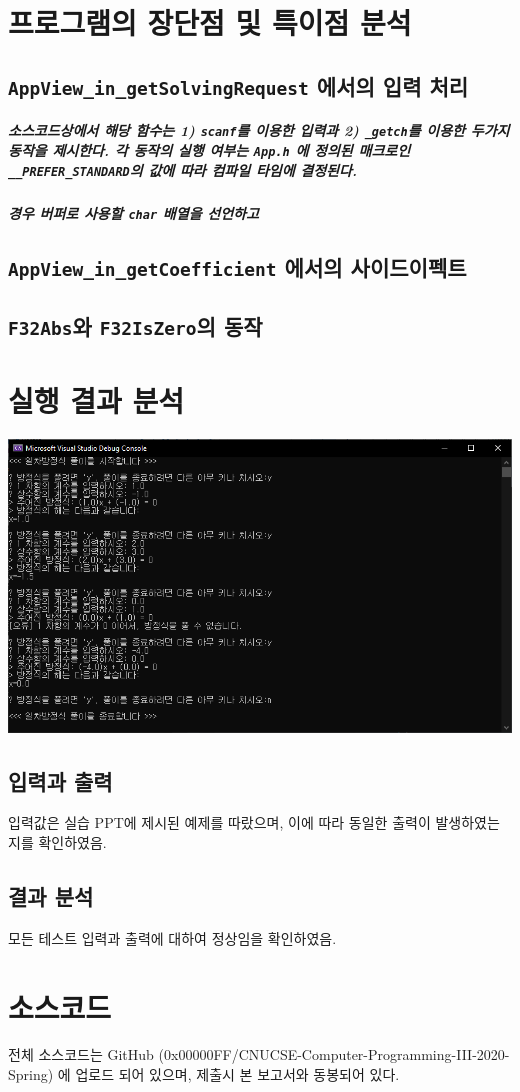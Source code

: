 \documentclass{article}
\begin{document}
    \section{프로그램의 장단점 및 특이점 분석}
    
    \subsection{\texttt{AppView\_in\_getSolvingRequest} 에서의 입력 처리}

    \subparagraph{ 소스코드상에서 해당 함수는 1) \texttt{scanf}를 이용한 입력과 2) \texttt{_getch}를 이용한 두가지 동작을 제시한다. 각 동작의 실행 여부는 \texttt{App.h} 에 정의된 매크로인 \texttt{__PREFER_STANDARD}의 값에 따라 컴파일 타임에 결정된다.}

    \subparagraph{ 경우 버퍼로 사용할 \texttt{char} 배열을 선언하고 }


    \subsection{\texttt{AppView\_in\_getCoefficient} 에서의 사이드이펙트}

    \subsection{\texttt{F32Abs}와 \texttt{F32IsZero}의 동작}

    \section{실행 결과 분석}

    \includegraphics[width=\textwidth]{test_result.png}

    \subsection{입력과 출력}

    입력값은 실습 PPT에 제시된 예제를 따랐으며, 이에 따라 동일한 출력이 발생하였는 지를 확인하였음.

    \subsection{결과 분석}

    모든 테스트 입력과 출력에 대하여 정상임을 확인하였음. 
    
    \section{소스코드}
    전체 소스코드는 GitHub (0x00000FF/CNUCSE-Computer-Programming-III-2020-Spring) 에 업로드 되어 있으며, 제출시 본 보고서와 동봉되어 있다.
\end{document}
